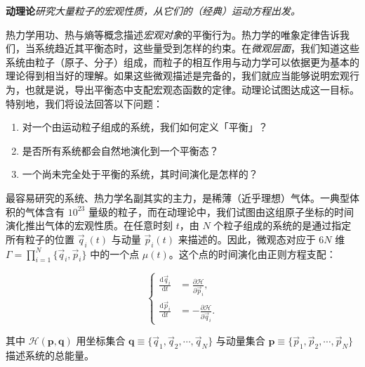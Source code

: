 

\textbf{动理论}\emph{研究大量粒子的宏观性质，从它们的（经典）运动方程出发。}

热力学用功、热与熵等概念描述\emph{宏观对象}的平衡行为。热力学的唯象定律告诉我们，当系统趋近其平衡态时，这些量受到怎样的约束。在\emph{微观层面}，我们知道这些系统由粒子（原子、分子）组成，而粒子的相互作用与动力学可以依据更为基本的理论得到相当好的理解。如果这些微观描述是完备的，我们就应当能够说明宏观行为，也就是说，导出平衡态中支配宏观态函数的定律。动理论试图达成这一目标。特别地，我们将设法回答以下问题：

\begin{enumerate}[itemsep=0.35em,topsep=0.4em]
  \item 对一个由运动粒子组成的系统，我们如何定义「平衡」？
  \item 是否所有系统都会自然地演化到一个平衡态？
  \item 一个尚未完全处于平衡的系统，其时间演化是怎样的？
\end{enumerate}

最容易研究的系统、热力学名副其实的主力，是稀薄（近乎理想）气体。一典型体积的气体含有 $10^{23}$ 量级的粒子，而在动理论中，我们试图由这组原子坐标的时间演化推出气体的宏观性质。在任意时刻 $t$，由 $N$ 个粒子组成的系统的是通过指定所有粒子的位置 $\vec q_i(t)$ 与动量 $\vec p_i(t)$ 来描述的。因此，微观态对应于 $6N$ 维 $\Gamma=\prod_{i=1}^N\{\vec q_i,\vec p_i\}$ 中的一个点 $\mu(t)$。这个点的时间演化由正则方程支配：

\begin{equation}\label{eq:3.1}
  \left\{\begin{aligned}
    \frac{\mathrm{d}\vec q_i}{\mathrm{d}t} &= \frac{\partial\mathscr H}{\partial\vec p_i},\\[4pt]
    \frac{\mathrm{d}\vec p_i}{\mathrm{d}t} &= -\frac{\partial\mathscr H}{\partial\vec q_i}.
  \end{aligned}\right.
\end{equation}

其中 $\mathscr H(\bm p,\bm q)$ 用坐标集合 $\bm q\equiv\{\vec q_1,\vec q_2,\cdots,\vec q_N\}$ 与动量集合 $\bm p\equiv\{\vec p_1,\vec p_2,\cdots,\vec p_N\}$ 描述系统的总能量。

